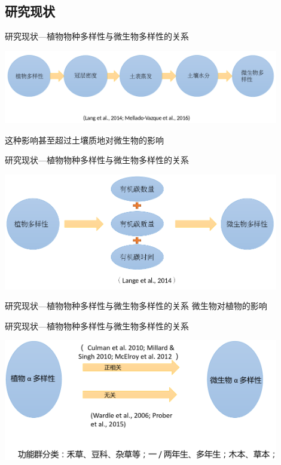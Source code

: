 \subsection{研究现状}
\begin{frame}{\insertsection}{\insertsubsection}
	研究现状—植物物种多样性与微生物多样性的关系
	\begin{center}
		\includegraphics[width = 0.9\textwidth]{./pic/研究现状附一.png}
	\end{center}
	这种影响甚至超过土壤质地对微生物的影响
\end{frame}
\begin{frame}{\insertsection}{\insertsubsection}
	研究现状—植物物种多样性与微生物多样性的关系
	\begin{center}
		\includegraphics[width = 0.9\textwidth]{./pic/研究现状0.png}
	\end{center}
\end{frame}
\begin{frame}{\insertsection}{\insertsubsection}
	研究现状—植物物种多样性与微生物多样性的关系
	微生物对植物的影响
\end{frame}
\begin{frame}{\insertsection}{\insertsubsection}
	研究现状—植物物种多样性与微生物多样性的关系
	\begin{center}
		\includegraphics[width = 0.9\textwidth]{./pic/研究现状.png}
	\end{center}
\end{frame}

